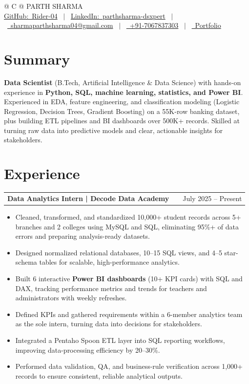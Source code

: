 \documentclass[a4paper,10pt]{article}
\makeatletter
\newcommand{\faGithub}{GitHub:}\newcommand{\faLinkedin}{LinkedIn:}\newcommand{\faEnvelope}{}%
\newcommand{\faMobile}{}\newcommand{\faGlobe}{}}
\newenvironment{joblong}[2]
    {
    \begin{tabularx}{\linewidth}{@{}l X r@{}}
    \textbf{#1} & \hfill &  #2 \\[2pt]
    \end{tabularx}
    \begin{minipage}[t]{\linewidth}
    \begin{itemize}[nosep,after=\strut, leftmargin=1em, itemsep=1pt,label=--]
    }
    {
    \end{itemize}
    \end{minipage}
    }
\makeatother
\begin{document}
\pagestyle{empty}

\begin{tabularx}{\linewidth}{@{} C @{}}
\Huge{PARTH SHARMA} \\[5pt]
\href{https://github.com/Rider-04}{\raisebox{-0.05\height}\faGithub\ Rider-04} \ $|$ \
\href{https://www.linkedin.com/in/parthsharma-dsxpert}{\raisebox{-0.05\height}\faLinkedin\ parthsharma-dsxpert} \ $|$ \
\href{mailto:sharmaparthsharma04@gmail.com}{\raisebox{-0.05\height}\faEnvelope \ sharmaparthsharma04@gmail.com} \ $|$ \
\href{tel:+917067837303}{\raisebox{-0.05\height}\faMobile \ +91-7067837303} \ $|$ \
\href{https://parth-portfolio-virid.vercel.app/}{\raisebox{-0.05\height}\faGlobe \ Portfolio}
\end{tabularx}

\section{Summary}
\textbf{Data Scientist} (B.Tech, Artificial Intelligence \& Data Science) with hands-on experience in \textbf{Python, SQL, machine learning, statistics, and Power BI}. Experienced in EDA, feature engineering, and classification modeling (Logistic Regression, Decision Trees, Gradient Boosting) on a 55K-row banking dataset, plus building ETL pipelines and BI dashboards over 500K+ records. Skilled at turning raw data into predictive models and clear, actionable insights for stakeholders.

\section{Experience}
\begin{joblong}{Data Analytics Intern | Decode Data Academy}{July 2025 -- Present}
\item Cleaned, transformed, and standardized 10,000+ student records across 5+ branches and 2 colleges using MySQL and SQL, eliminating 95\%+ of data errors and preparing analysis-ready datasets.
\item Designed normalized relational databases, 10--15 SQL views, and 4--5 star-schema tables for scalable, high-performance analytics.
\item Built 6 interactive \textbf{Power BI dashboards} (10+ KPI cards) with SQL and DAX, tracking performance metrics and trends for teachers and administrators with weekly refreshes.
\item Defined KPIs and gathered requirements within a 6-member analytics team as the sole intern, turning data into decisions for stakeholders.
\item Integrated a Pentaho Spoon ETL layer into SQL reporting workflows, improving data-processing efficiency by 20--30\%.
\item Performed data validation, QA, and business-rule verification across 1,000+ records to ensure consistent, reliable analytical outputs.
\end{joblong}
\end{document}
